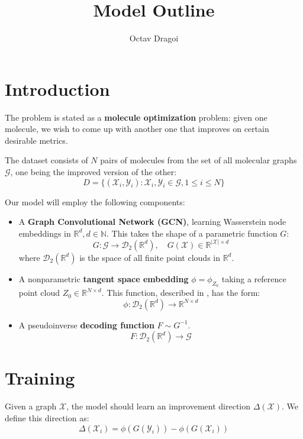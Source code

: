 \documentclass{article}
\begin{document}
\title{Model Outline}
\author{Octav Dragoi}

\maketitle

\section{Introduction}

The problem is stated as a \textbf{molecule optimization} problem: given one molecule, we wish to come up with another one that improves on certain desirable metrics.

The dataset consists of $N$ pairs of molecules from the set of all molecular graphs $\mathcal{G}$, one being the improved version of the other:
\begin{equation}
    \label{eq:problem_setup}
    D = \{(\mathcal{X}_i, \mathcal{Y}_i) : \mathcal{X}_i, \mathcal{Y}_i\in \mathcal{G}, 1\leq i\leq N\}
\end{equation}

Our model will employ the following components:
\begin{itemize}
    \item A \textbf{Graph Convolutional Network (GCN)}, learning Wasserstein node embeddings in $\mathbb{R}^d, d\in \mathbb{N}$. This takes the shape of a parametric function $G$:
    \[G:\mathcal{G} \rightarrow \mathscr{D}_2({\mathbb{R}^d}),\quad G(\mathcal{X})\in \mathbb{R}^{|\mathcal{X}|\times d} \] 
    where $\mathscr{D}_2({\mathbb{R}^d})$ is the space of all finite point clouds in $\mathbb{R}^d$.
    \item A nonparametric \textbf{tangent space embedding} $\phi = \phi_{Z_0}$ taking a reference point cloud $Z_0\in \mathbb{R}^{N\times d}$. This function, described in \cite{kolouri2020wasserstein}, has the form:
    \[\phi : \mathscr{D}_2({\mathbb{R}^d}) \rightarrow \mathbb{R}^{N\times d}\]
    \item A pseudoinverse \textbf{decoding function} $F\sim G^{-1}$.
    \[F : \mathscr{D}_2({\mathbb{R}^d})\rightarrow \mathcal{G}\]
\end{itemize}

\section{Training}
Given a graph $\mathcal{X}$, the model should learn an improvement direction $\Delta(\mathcal{X})$. We define this direction as:
\[\Delta(\mathcal{X}_i) = \phi(G(\mathcal{Y}_i))-\phi(G(\mathcal{X}_i)) \]
\end{document}
